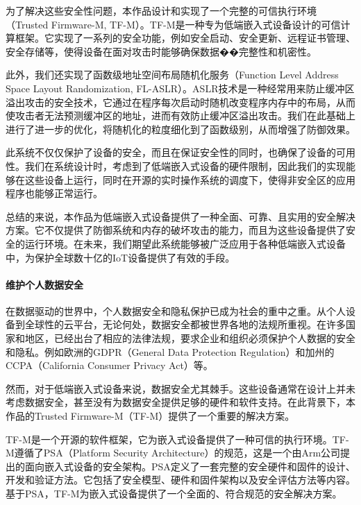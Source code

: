 \documentclass[12pt,a4paper]{ctexart}
\numberwithin{figure}{section}
\begin{document}
\par 为了解决这些安全性问题，本作品设计和实现了一个完整的可信执行环境（Trusted Firmware-M, TF-M）。TF-M是一种专为低端嵌入式设备设计的可信计算框架。它实现了一系列的安全功能，例如安全启动、安全更新、远程证书管理、安全存储等，使得设备在面对攻击时能够确保数据��完整性和机密性。

\par 此外，我们还实现了函数级地址空间布局随机化服务（Function Level Address Space Layout Randomization, FL-ASLR）。ASLR技术是一种经常用来防止缓冲区溢出攻击的安全技术，它通过在程序每次启动时随机改变程序内存中的布局，从而使攻击者无法预测缓冲区的地址，进而有效防止缓冲区溢出攻击。我们在此基础上进行了进一步的优化，将随机化的粒度细化到了函数级别，从而增强了防御效果。

\par 此系统不仅仅保护了设备的安全，而且在保证安全性的同时，也确保了设备的可用性。我们在系统设计时，考虑到了低端嵌入式设备的硬件限制，因此我们的实现能够在这些设备上运行，同时在开源的实时操作系统的调度下，使得非安全区的应用程序也能够正常运行。

\par 总结的来说，本作品为低端嵌入式设备提供了一种全面、可靠、且实用的安全解决方案。它不仅提供了防御系统和内存的破坏攻击的能力，而且为这些设备提供了安全的运行环境。在未来，我们期望此系统能够被广泛应用于各种低端嵌入式设备中，为保护全球数十亿的IoT设备提供了有效的手段。
\paragraph{维护个人数据安全}
\par 在数据驱动的世界中，个人数据安全和隐私保护已成为社会的重中之重。从个人设备到全球性的云平台，无论何处，数据安全都被世界各地的法规所重视。在许多国家和地区，已经出台了相应的法律法规，要求企业和组织必须保护个人数据的安全和隐私。例如欧洲的GDPR（General Data Protection Regulation）和加州的CCPA（California Consumer Privacy Act）等。

\par 然而，对于低端嵌入式设备来说，数据安全尤其棘手。这些设备通常在设计上并未考虑数据安全，甚至没有为数据安全提供足够的硬件和软件支持。在此背景下，本作品的Trusted Firmware-M（TF-M）提供了一个重要的解决方案。

\par TF-M是一个开源的软件框架，它为嵌入式设备提供了一种可信的执行环境。TF-M遵循了PSA（Platform Security Architecture）的规范，这是一个由Arm公司提出的面向嵌入式设备的安全架构。PSA定义了一套完整的安全硬件和固件的设计、开发和验证方法。它包括了安全模型、硬件和固件架构以及安全评估方法等内容。基于PSA，TF-M为嵌入式设备提供了一个全面的、符合规范的安全解决方案。
\end{document}
